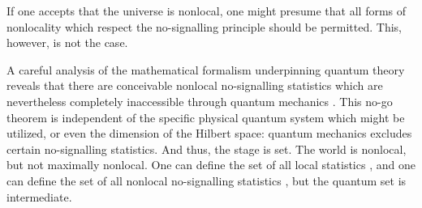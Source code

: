 \documentclass[
  12pt          %
  ,letterpaper  %
  ,center       %
  ,noupper      %
  ,english,fleqn]{uconnthesis}
\begin{document}
    If one accepts that the universe is nonlocal, one might presume that all forms of nonlocality which respect the no-signalling principle should be permitted. This, however, is not the case.
    
    A careful analysis of the mathematical formalism underpinning quantum theory reveals that there are conceivable nonlocal no-signalling statistics which are nevertheless completely inaccessible through quantum mechanics \cite{Tsirelson1980,PROriginal,PRUnit,BellSimple,roberts_thesis,HowMuchLarger,DiscreteEntanglementNonlocality,Brunner2013Bell,PopescuReviewNatureComm}. This no-go theorem is independent of the specific physical quantum system which might be utilized, or even the dimension of the Hilbert space: quantum mechanics excludes certain no-signalling statistics. And thus, the stage is set. The world is nonlocal, but not maximally nonlocal. One can define the set of all local statistics \cite{GeneralNoSignalling,WringingBellInequalities}, and one can define the set of all nonlocal no-signalling statistics \cite{GisinFramework2012,BellInequalitiesReview}, but the quantum set is intermediate.
    
\end{document}
